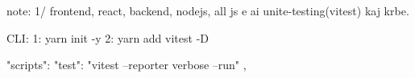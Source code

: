 note: 
1/ frontend, react, backend, nodejs, all js e ai unite-testing(vitest) kaj krbe.

CLI:
1: yarn init -y
2: yarn add vitest -D

"scripts": {
    "test": "vitest --reporter verbose --run"
  },